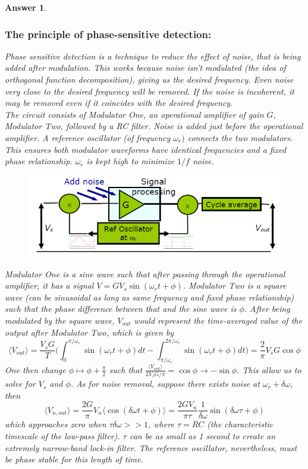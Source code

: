 \documentclass[a4paper]{article}
\newtheorem{ans}{Answer}[subsection]
\theoremstyle{new}
\begin{document}
\begin{ans}
\subsubsection*{The principle of phase-sensitive detection:}
Phase sensitive detection is a technique to reduce the effect of noise, that is being added after modulation. This works because noise isn't modulated (the idea of orthogonal function decomposition), giving us the desired frequency. Even noise very close to the desired frequency will be removed. If the noise is incoherent, it may be removed even if it coincides with the desired frequency.\\[5pt]
The circuit consists of Modulator One, an operational amplifier of gain $G$, Modulator Two, followed by a RC filter. Noise is added just before the operational amplifier. A reference oscillator (of frequency $\omega_r)$ connects the two modulators. This ensures both modulator waveforms have identical frequencies and a fixed phase relationship. $\omega_r$ is kept high to minimize $1/f$ noise.
\begin{figure}[H]
    \centering
    \includegraphics[width=\linewidth]{phase_sensitive.PNG}
\end{figure}
Modulator One is a sine wave such that after passing through the operational amplifier, it has a signal $V=GV_s\sin(\omega_rt+\phi)$. Modulator Two is a square wave (can be sinusoidal as long as same frequency and fixed phase relationship) such that the phase difference between that and the sine wave is $\phi$. After being modulated by the square wave, $V_{out}$ would represent the time-averaged value of the output after Modulator Two, which is given by 
$$\langle V_{out}\rangle=\frac{V_sG}{T}\bigg(\int_0^{\pi/\omega_r}\sin(\omega_rt+\phi)dt-\int_{\pi/\omega_r}^{2\pi/\omega_r}\sin(\omega_rt+\phi)dt\bigg)=\frac{2}{\pi}V_sG\cos\phi$$
One then change $\phi\mapsto\phi+\frac{\pi}{2}$ such that $\frac{\langle V_{out}\rangle}{2V_sG/\pi}=\cos\phi\rightarrow-\sin\phi$. This allow us to solve for $V_s$ and $\phi$. As for noise removal, suppose there exists noise at $\omega_r+\delta\omega$, then
$$\langle V_{n,out}\rangle=\frac{2G}{\pi}V_n\langle\cos(\delta\omega t+\phi)\rangle=\frac{2GV_n}{\pi\tau}\frac{1}{\delta\omega}\sin(\delta\omega\tau+\phi)$$
which approaches zero when $\tau\delta\omega>>1$, where $\tau=RC$ (the characteristic timescale of the low-pass filter). $\tau$ can be as small as 1 second to create an extremely narrow-band lock-in filter. The reference oscillator, nevertheless, must be phase stable for this length of time.


\end{ans}
\end{document}
